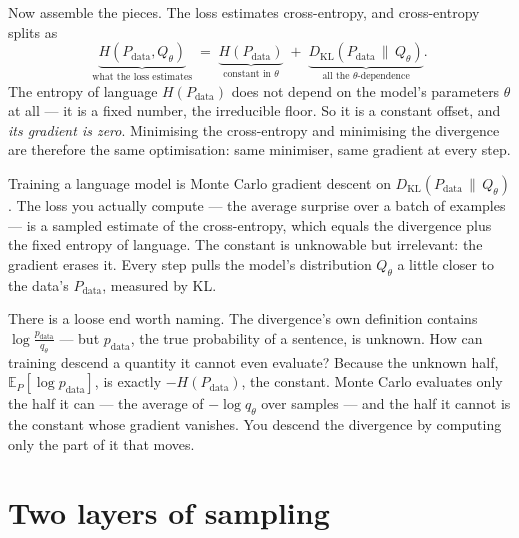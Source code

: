 \documentclass[11pt]{article}
\begin{document}
Now assemble the pieces. The loss estimates cross-entropy, and cross-entropy splits as
\[
  \underbrace{H(P_{\text{data}}, Q_\theta)}_{\text{what the loss estimates}}
  \;=\; \underbrace{H(P_{\text{data}})}_{\text{constant in } \theta}
  \;+\; \underbrace{D_{\mathrm{KL}}(P_{\text{data}} \,\|\, Q_\theta)}_{\text{all the } \theta\text{-dependence}}.
\]
The entropy of language $H(P_{\text{data}})$ does not depend on the model's parameters
$\theta$ at all --- it is a fixed number, the irreducible floor. So it is a constant offset,
and \emph{its gradient is zero}. Minimising the cross-entropy and minimising the divergence
are therefore the same optimisation: same minimiser, same gradient at every step.
\begin{summary}
Training a language model is Monte Carlo gradient descent on $D_{\mathrm{KL}}(P_{\text{data}}
\,\|\, Q_\theta)$. The loss you actually compute --- the average surprise over a batch of
examples --- is a sampled estimate of the cross-entropy, which equals the divergence plus the
fixed entropy of language. The constant is unknowable but irrelevant: the gradient erases it.
Every step pulls the model's distribution $Q_\theta$ a little closer to the data's
$P_{\text{data}}$, measured by KL.
\end{summary}

There is a loose end worth naming. The divergence's own definition contains
$\log\frac{p_{\text{data}}}{q_\theta}$ --- but $p_{\text{data}}$, the true probability of a
sentence, is unknown. How can training descend a quantity it cannot even evaluate? Because the
unknown half, $\mathbb{E}_P[\log p_{\text{data}}]$, is exactly $-H(P_{\text{data}})$, the
constant. Monte Carlo evaluates only the half it can --- the average of $-\log q_\theta$ over
samples --- and the half it cannot is the constant whose gradient vanishes. You descend the
divergence by computing only the part of it that moves.

\section{Two layers of sampling}
\end{document}
